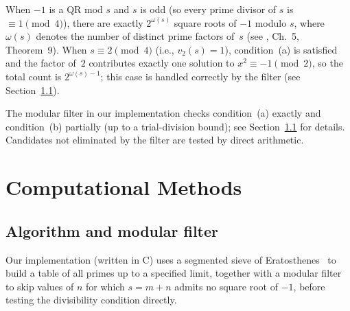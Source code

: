 \documentclass[pdflatex,sn-mathphys-num,Numbered]{sn-jnl}
\theoremstyle{thmstyleone}
\theoremstyle{thmstylethree}
\theoremstyle{thmstyletwo}
\numberwithin{equation}{section}
\begin{document}
When $-1$ is a QR mod $s$ and $s$ is odd (so every prime divisor of
$s$ is $\equiv 1 \pmod{4}$), there are exactly $2^{\omega(s)}$ square
roots of $-1$ modulo $s$, where $\omega(s)$ denotes the number of
distinct prime factors of~$s$ (see \cite{IrelandRosen}, Ch.~5,
Theorem~9).
When $s \equiv 2 \pmod{4}$ (i.e., $v_2(s) = 1$), condition~(a) is
satisfied and the factor of~$2$ contributes exactly one solution to
$x^2 \equiv -1 \pmod{2}$, so the total count is $2^{\omega(s)-1}$;
this case is handled correctly by the filter
(see Section~\ref{sec:filter}).

The modular filter in our implementation checks condition~(a) exactly
and condition~(b) partially (up to a trial-division bound); see
Section~\ref{sec:filter} for details.
Candidates not eliminated by the filter are tested by direct arithmetic.

\section{Computational Methods}
\label{sec:methods}

\subsection{Algorithm and modular filter}
\label{sec:filter}

Our implementation (written in C) uses a segmented sieve of
Eratosthenes~\cite{CrandallPomerance} to build a table of all primes up
to a specified limit, together with a modular filter to skip values of
$n$ for which $s = m + n$ admits no square root of $-1$, before testing
the divisibility condition directly.
\end{document}
